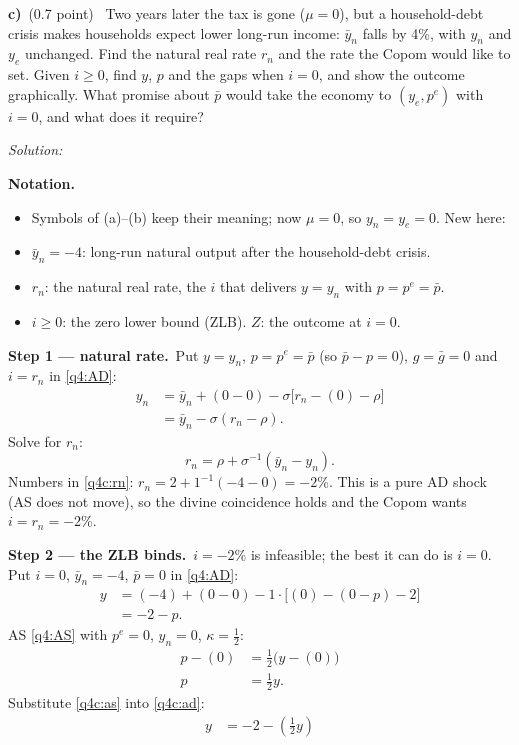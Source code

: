 \documentclass[11pt,a4paper]{article}
\newif\ifsolucoes
\newcommand{\espacoresol}{6cm}
\newcommand{\parte}[2]{\par\Needspace{6\baselineskip}\medskip\noindent\textbf{#1)}~(#2)~}
\newcommand{\resolespaco}{\ifsolucoes\else\par\textit{Solution:}\vspace{\espacoresol}\par\fi}
\newcommand{\passo}[2]{\par\smallskip\noindent\textbf{Step #1.}~#2}
\newenvironment{notacao}{\par\smallskip\noindent\textbf{Notation.}\begin{itemize}[leftmargin=1.4em,topsep=1pt,itemsep=0pt]\small}{\end{itemize}}
\begin{document}
\parte{c}{0.7 point} Two years later the tax is gone ($\mu=0$), but a household-debt crisis makes households expect
lower long-run income: $\bar y_n$ falls by 4\%, with $y_n$ and $y_e$ unchanged. Find the natural real rate $r_n$ and
the rate the Copom would like to set. Given $i\ge0$, find $y$, $p$ and the gaps when $i=0$, and show the outcome
graphically. What promise about $\bar p$ would take the economy to $(y_e,p^e)$ with $i=0$, and what does it require?
\resolespaco
\begin{sol}
\begin{notacao}
\item Symbols of (a)--(b) keep their meaning; now $\mu=0$, so $y_n=y_e=0$. New here:
\item $\bar y_n=-4$: long-run natural output after the household-debt crisis.
\item $r_n$: the natural real rate, the $i$ that delivers $y=y_n$ with $p=p^e=\bar p$.
\item $i\ge0$: the zero lower bound (ZLB). $Z$: the outcome at $i=0$.
\end{notacao}
\passo{1 --- natural rate}{Put $y=y_n$, $p=p^e=\bar p$ (so $\bar p-p=0$), $g=\bar g=0$ and $i=r_n$ in
\eqref{q4:AD}:
\begin{align*}
y_n &= \bar y_n+(0-0)-\sigma\big[r_n-(0)-\rho\big]\\
&= \bar y_n-\sigma(r_n-\rho).
\end{align*}
Solve for $r_n$:
\begin{equation}
\boxed{r_n=\rho+\sigma^{-1}(\bar y_n-y_n)}. \label{q4c:rn}
\end{equation}
Numbers in \eqref{q4c:rn}: $r_n=2+1^{-1}(-4-0)=\boxed{-2\%}$. This is a pure AD shock (AS does not move), so the divine
coincidence holds and the Copom wants $i=r_n=-2\%$.}
\passo{2 --- the ZLB binds}{$i=-2\%$ is infeasible; the best it can do is $i=0$. Put $i=0$, $\bar y_n=-4$,
$\bar p=0$ in \eqref{q4:AD}:
\begin{align}
y &= (-4)+(0-0)-1\cdot\big[(0)-(0-p)-2\big]\nonumber\\
&= -2-p. \label{q4c:ad}
\end{align}
AS \eqref{q4:AS} with $p^e=0$, $y_n=0$, $\kappa=\tfrac12$:
\begin{align}
p-(0) &= \tfrac12\big(y-(0)\big)\nonumber\\
p &= \tfrac12y. \label{q4c:as}
\end{align}
Substitute \eqref{q4c:as} into \eqref{q4c:ad}:
\begin{align*}
y &= -2-\left(\tfrac12y\right)\\

\end{align*}}
\end{sol}
\end{document}
